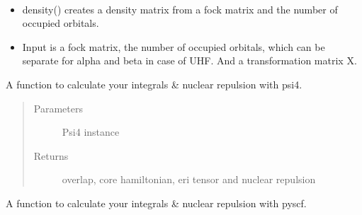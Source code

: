 \documentclass[letterpaper,10pt,english]{sphinxmanual}
\begin{document}
\begin{fulllineitems}
\label{\detokenize{SCF_functions:hf.utilities.SCF_functions.density_matrix}}~\begin{itemize}
\item {} 
density() creates a density matrix from a fock matrix and the number of occupied orbitals.

\item {} 
Input is a fock matrix, the number of occupied orbitals, which can be separate for alpha and beta in case of UHF.
And a transformation matrix X.

\end{itemize}

\end{fulllineitems}


\begin{fulllineitems}
\label{\detokenize{SCF_functions:hf.utilities.SCF_functions.get_integrals_psi4}}
A function to calculate your integrals \& nuclear repulsion with psi4.
\begin{quote}\begin{description}
\item[{Parameters}] \leavevmode
{} \textendash{} Psi4 instance

\item[{Returns}] \leavevmode
overlap, core hamiltonian, eri tensor and nuclear repulsion

\end{description}\end{quote}

\end{fulllineitems}


\begin{fulllineitems}
\label{\detokenize{SCF_functions:hf.utilities.SCF_functions.get_integrals_pyscf}}
A function to calculate your integrals \& nuclear repulsion with pyscf.

\end{fulllineitems}
\end{document}
